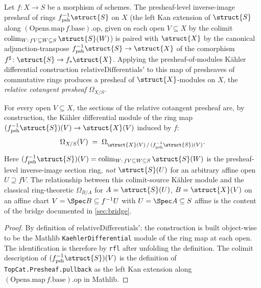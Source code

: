 \begin{definition}

  \label{def:relative_kaehler_presheaf}
  Let \(f \colon X \to S\) be a morphism of schemes. The presheaf-level inverse-image presheaf of rings \(f^{-1}_{\mathrm{psh}}\struct{S}\) on \(X\) (the left Kan extension of \(\struct{S}\) along \((\mathrm{Opens.map}\,f.\mathrm{base}).\mathrm{op}\), given on each open \(V \subseteq X\) by the colimit \(\mathrm{colim}_{W : \,f V \subseteq W \subseteq S}\,\struct{S}(W)\)) is paired with \(\struct{X}\) by the canonical adjunction-transpose \(f^{-1}_{\mathrm{psh}}\struct{S} \to \struct{X}\) of the comorphism \(f^{\sharp}\colon\struct{S}\to f_{*}\struct{X}\). Applying the presheaf-of-modules K\"ahler differential construction \(\mathrm{relativeDifferentials}'\) to this map of presheaves of commutative rings produces a presheaf of \(\struct{X}\)-modules on \(X\), the \emph{relative cotangent presheaf} \(\Omega_{X/S}\).
\end{definition}

\begin{lemma}

  \label{lem:relative_kaehler_presheaf_obj}
  
  For every open \(V \subseteq X\), the sections of the relative cotangent presheaf are, by construction, the K\"ahler differential module of the ring map \((f^{-1}_{\mathrm{psh}}\struct{S})(V) \to \struct{X}(V)\) induced by \(f\):
  \[
    \Omega_{X/S}(V) \;=\; \Omega_{\struct{X}(V) \,/\, (f^{-1}_{\mathrm{psh}}\struct{S})(V)}.
  \]
  Here \((f^{-1}_{\mathrm{psh}}\struct{S})(V) = \mathrm{colim}_{W : \,f V \subseteq W \subseteq S}\,\struct{S}(W)\) is the presheaf-level inverse-image section ring, \emph{not} \(\struct{S}(U)\) for an arbitrary affine open \(U \supseteq f V\). The relationship between this colimit-source K\"ahler module and the classical ring-theoretic \(\Omega_{B/A}\) for \(A = \struct{S}(U)\), \(B = \struct{X}(V)\) on an affine chart \(V = \Spec B \subseteq f^{-1}U\) with \(U = \Spec A \subseteq S\) affine is the content of the bridge documented in \cref{sec:bridge}.
\end{lemma}

\begin{proof}
  
  \leanok
  By definition of \(\mathrm{relativeDifferentials}'\): the construction is built object-wise to be the Mathlib \texttt{KaehlerDifferential} module of the ring map at each open. The identification is therefore by \texttt{rfl} after unfolding the definition. The colimit description of \((f^{-1}_{\mathrm{psh}}\struct{S})(V)\) is the definition of \texttt{TopCat.Presheaf.pullback} as the left Kan extension along \((\mathrm{Opens.map}\,f.\mathrm{base}).\mathrm{op}\) in Mathlib.
\end{proof}

